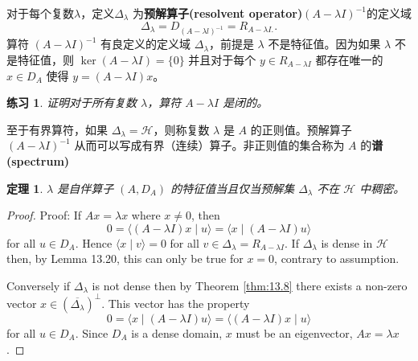 \documentclass[hyperref,UTF8]{ctexbook}
\newtheorem{theorem}{定理}[chapter]
\newtheorem*{exercise}{练习}
\begin{document}
对于每个复数\(\lambda\)，定义\(\Delta_{\lambda}\) 为\textbf{预解算子(resolvent operator)}\((A-\lambda I)^{-1}\)的定义域
\[
\Delta_{\lambda}=D_{(A-\lambda l)^{-1}}=R_{A-\lambda I .} .
\]
算符 \((A-\lambda I)^{-1}\) 有良定义的定义域 \(\Delta_{\lambda}\)，前提是 \(\lambda\) 不是特征值。因为如果 \(\lambda\) 不是特征值，则 \(\operatorname{ker}(A-\lambda I)=\{0\}\) 并且对于每个 \(y \in R_{A-\lambda I}\) 都存在唯一的 \(x\in D_{A}\) 使得 \(y=(A-\lambda I) x\)。
\begin{exercise}
    证明对于所有复数 \(\lambda\)，算符 \(A-\lambda I\) 是闭的。
\end{exercise}
至于有界算符，如果 \(\Delta_{\lambda}=\mathcal{H}\)，则称复数 \(\lambda\) 是 \(A\) 的正则值。预解算子 \((A-\lambda I)^{-1}\) 从而可以写成有界（连续）算子。非正则值的集合称为 \(A\) 的\textbf{谱(spectrum)}
\begin{theorem}
    \( \lambda\) 是自伴算子 \(\left(A, D_{A}\right)\) 的特征值当且仅当预解集 \(\Delta_{\lambda}\) 不在 \(\mathcal{H}\) 中稠密。
\end{theorem}
\begin{proof}
    Proof: If \(A x=\lambda x\) where \(x \neq 0\), then
\[
0=\langle(A-\lambda I) x \mid u\rangle=\langle x \mid(A-\lambda I) u\rangle
\] 
for all \(u \in D_{A}\). Hence \(\langle x \mid v\rangle=0\) for all \(v \in \Delta_{\lambda}=R_{A-\lambda I}\). If \(\Delta_{\lambda}\) is dense in \(\mathcal{H}\) then, by Lemma 13.20, this can only be true for \(x=0\), contrary to assumption.

Conversely if \(\Delta_{\lambda}\) is not dense then by Theorem \ref{thm:13.8} there exists a non-zero vector \(x \in\left(\overline{\Delta_{\lambda}}\right)^{\perp}\). This vector has the property
\[
0=\langle x \mid(A-\lambda I) u\rangle=\langle(A-\lambda I) x \mid u\rangle
\]
for all \(u \in D_{A}\). Since \(D_{A}\) is a dense domain, \(x\) must be an eigenvector, \(A x=\lambda x\).
\end{proof}
\end{document}

